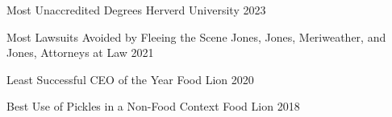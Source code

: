 



\begin{cvhonors}

  \cvhonor
    {Most Unaccredited Degrees} %
    {Herverd University} %
    {} %
    {2023} %

  \cvhonor
    {Most Lawsuits Avoided by Fleeing the Scene} %
    {Jones, Jones, Meriweather, and Jones, Attorneys at Law} %
    {} %
    {2021} %

  \cvhonor
    {Least Successful CEO of the Year} %
    {Food Lion} %
    {} %
    {2020} %

  \cvhonor
    {Best Use of Pickles in a Non-Food Context} %
    {Food Lion} %
    {} %
    {2018} %

\end{cvhonors}
